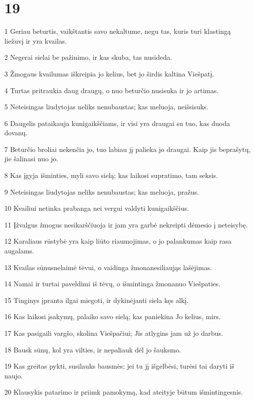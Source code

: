 \chapter{19}


\par 1 Geriau beturtis, vaikštantis savo nekaltume, negu tas, kuris turi klastingą liežuvį ir yra kvailas. 
\par 2 Negerai sielai be pažinimo, ir kas skuba, tas nusideda. 
\par 3 Žmogaus kvailumas iškreipia jo kelius, bet jo širdis kaltina Viešpatį. 
\par 4 Turtas pritraukia daug draugų, o nuo beturčio nusisuka ir jo artimas. 
\par 5 Neteisingas liudytojas neliks nenubaustas; kas meluoja, neišsisuks. 
\par 6 Daugelis pataikauja kunigaikščiams, ir visi yra draugai su tuo, kas duoda dovanų. 
\par 7 Beturčio broliai nekenčia jo, tuo labiau jį palieka jo draugai. Kaip jis beprašytų, jie šalinasi nuo jo. 
\par 8 Kas įgyja išminties, myli savo sielą; kas laikosi supratimo, tam seksis. 
\par 9 Neteisingas liudytojas neliks nenubaustas; kas meluoja, pražus. 
\par 10 Kvailiui netinka prabanga nei vergui valdyti kunigaikščius. 
\par 11 Įžvalgus žmogus nesikarščiuoja ir jam yra garbė nekreipti dėmesio į neteisybę. 
\par 12 Karaliaus rūstybė yra kaip liūto riaumojimas, o jo palankumas­ kaip rasa augalams. 
\par 13 Kvailas sūnus­nelaimė tėvui, o vaidinga žmona­nesiliaująs lašėjimas. 
\par 14 Namai ir turtai paveldimi iš tėvų, o išmintinga žmona­nuo Viešpaties. 
\par 15 Tinginys įpranta ilgai miegoti, ir dykinėjanti siela kęs alkį. 
\par 16 Kas laikosi įsakymų, palaiko savo sielą; kas paniekina Jo kelius, mirs. 
\par 17 Kas pasigaili vargšo, skolina Viešpačiui; Jis atlygins jam už jo darbus. 
\par 18 Bausk sūnų, kol yra vilties, ir nepaliauk dėl jo šauksmo. 
\par 19 Kas greitas pykti, susilauks bausmės; jei tu jį išgelbėsi, turėsi tai daryti iš naujo. 
\par 20 Klausykis patarimo ir priimk pamokymą, kad ateityje būtum išmintingesnis. 
